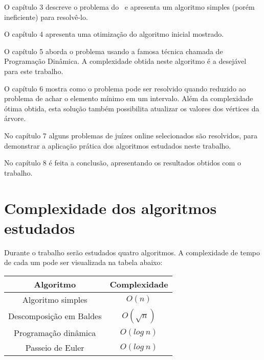 O capítulo 3 descreve o problema do \LCA\ e apresenta um algoritmo simples (porém ineficiente) para resolvê-lo.

\vspace{0.2cm}

O capítulo 4 apresenta uma otimização do algoritmo inicial mostrado.

\vspace{0.2cm}

O capítulo 5 aborda o problema usando a famosa técnica chamada de Programação Dinâmica. A complexidade obtida neste algoritmo é a desejável para este trabalho.

\vspace{0.2cm}

O capítulo 6 mostra como o problema pode ser resolvido quando reduzido ao problema de achar o elemento mínimo em um intervalo. Além da complexidade ótima obtida, esta solução também possibilita atualizar os valores dos vértices da árvore.

\vspace{0.2cm}

No capítulo 7 alguns problemas de juízes online selecionados são resolvidos, para demonstrar a aplicação prática dos algoritmos estudados neste trabalho.

\vspace{0.2cm}

No capítulo 8 é feita a conclusão, apresentando os resultados obtidos com o trabalho.


\section{Complexidade dos algoritmos estudados}

Durante o trabalho serão estudados quatro algoritmos. A complexidade de tempo de cada um pode ser visualizada na tabela abaixo:

\vspace{0.5cm}

\begin{table}[htb]
\centering
\begin{tabular}{|c|c|}
\hline
\textbf{Algoritmo}      & \textbf{Complexidade} \\ \hline
Algoritmo simples       & $O(n)$                  \\ \hline
Descomposição em Baldes & $O(\sqrt{n})$            \\ \hline
Programação dinâmica    & $O(log\ n)$              \\ \hline
Passeio de Euler        & $O(log\ n)$              \\ \hline
\end{tabular}
\end{table}